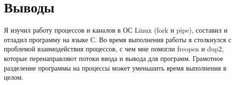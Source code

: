 \section{Выводы}

Я изучил работу процессов и каналов в ОС Linux (fork и pipe), составил и отладил программу на языке С. Во время выполнения работы я столкнулся с проблемой взаимодействия процессов, с чем мне помогли freopen и dup2, которые перенаправляют потоки ввода и вывода для программ. Грамотное разделение программы на процессы может уменьшить время выполнения в целом.
\pagebreak

